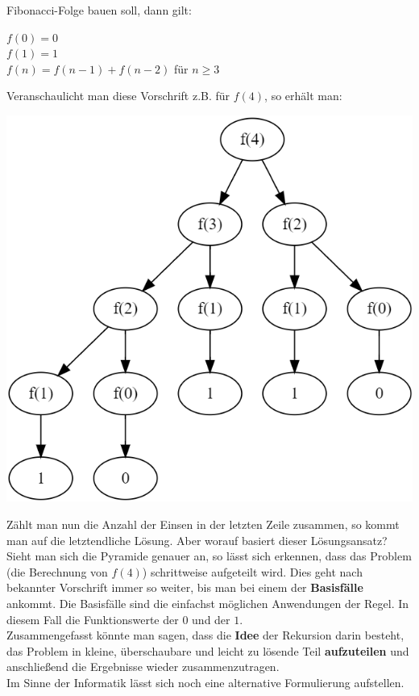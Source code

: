 \documentclass{article}
\begin{document}
Fibonacci-Folge bauen soll, dann gilt: 
\begin{center}
    $f(0) = 0$ \\
    $f(1) = 1$ \\
    $f(n) = f(n-1) + f(n-2)$ für $n\geq 3$
\end{center}
Veranschaulicht man diese Vorschrift z.B. für $f(4)$, so erhält man: 
\begin{center}
    \includegraphics[scale=0.5]{../../media/graph_fib.png}
\end{center}
Zählt man nun die Anzahl der Einsen in der letzten Zeile zusammen, so kommt man auf die letztendliche
Lösung. Aber worauf basiert dieser Lösungsansatz? \\
Sieht man sich die Pyramide genauer an, so lässt sich erkennen, dass das Problem (die Berechnung 
von $f(4)$) schrittweise aufgeteilt wird. Dies geht nach bekannter Vorschrift immer so weiter, bis
man bei einem der \textbf{Basisfälle} ankommt. Die Basisfälle sind die einfachst möglichen 
Anwendungen der Regel. In diesem Fall die Funktionswerte der $0$ und der $1$. \\
Zusammengefasst könnte man sagen, dass die \textbf{Idee} der Rekursion darin besteht, das Problem
in kleine, überschaubare und leicht zu lösende Teil \textbf{aufzuteilen} und anschließend die 
Ergebnisse wieder zusammenzutragen.  \\
Im Sinne der Informatik lässt sich noch eine alternative Formulierung aufstellen. 
\end{document}
